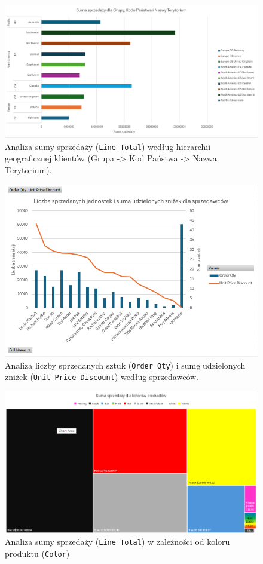 \documentclass[a4paper,12pt]{article}
\begin{document}
\begin{figure}[H]
    \centering
    \includegraphics[width=1.0\textwidth]{images/7_1.png}
    \caption{Analiza sumy sprzedaży (\texttt{Line Total}) według hierarchii geograficznej klientów (Grupa -> Kod Państwa -> Nazwa Terytorium).}
\end{figure}

\begin{figure}[H]
    \centering
    \includegraphics[width=1.0\textwidth]{images/7_2.png}
    \caption{Analiza liczby sprzedanych sztuk (\texttt{Order Qty}) i sumę udzielonych zniżek (\texttt{Unit Price Discount}) według sprzedawców.}
\end{figure}

\begin{figure}[H]
    \centering
    \includegraphics[width=1.0\textwidth]{images/7_3.png}
    \caption{Analiza sumy sprzedaży (\texttt{Line Total}) w zależności od koloru produktu (\texttt{Color})}
\end{figure}

\printbibliography
\end{document}
